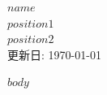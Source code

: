 \documentclass[11pt, a4paper]{ltjsarticle}
\begin{document}
\begin{center}
  {\LARGE\bfseries $name$}\\[0.3em]
  $position1$\\
  $position2$\\
  更新日: \today
\end{center}

\vspace{1em}

$body$
\end{document}
